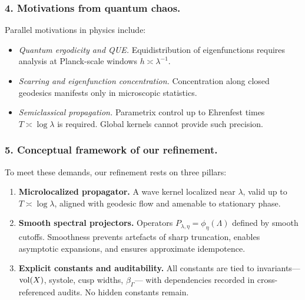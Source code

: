 \subsubsection*{4. Motivations from quantum chaos.}
Parallel motivations in physics include:
\begin{itemize}
  \item \emph{Quantum ergodicity and QUE.}  
        Equidistribution of eigenfunctions requires analysis at Planck-scale windows
        $h\asymp\lambda^{-1}$.
  \item \emph{Scarring and eigenfunction concentration.}  
        Concentration along closed geodesics manifests only in microscopic statistics.
  \item \emph{Semiclassical propagation.}  
        Parametrix control up to Ehrenfest times $T\asymp\log\lambda$ is required.
        Global kernels cannot provide such precision.
\end{itemize}

\medskip

\subsubsection*{5. Conceptual framework of our refinement.}
To meet these demands, our refinement rests on three pillars:

\begin{enumerate}[label=\Alph*.]
  \item \textbf{Microlocalized propagator.}
        A wave kernel localized near $\lambda$, valid up to $T\asymp\log\lambda$,
        aligned with geodesic flow and amenable to stationary phase.

  \item \textbf{Smooth spectral projectors.}
        Operators $P_{\lambda,\eta}=\phi_\eta(\Lambda)$ defined by smooth cutoffs.
        Smoothness prevents artefacts of sharp truncation, enables asymptotic expansions,
        and ensures approximate idempotence.

  \item \textbf{Explicit constants and auditability.}
        All constants are tied to invariants—$\operatorname{vol}(X)$, systole, cusp widths, $\beta_\Gamma$—
        with dependencies recorded in cross-referenced audits.
        No hidden constants remain.
\end{enumerate}

\medskip

